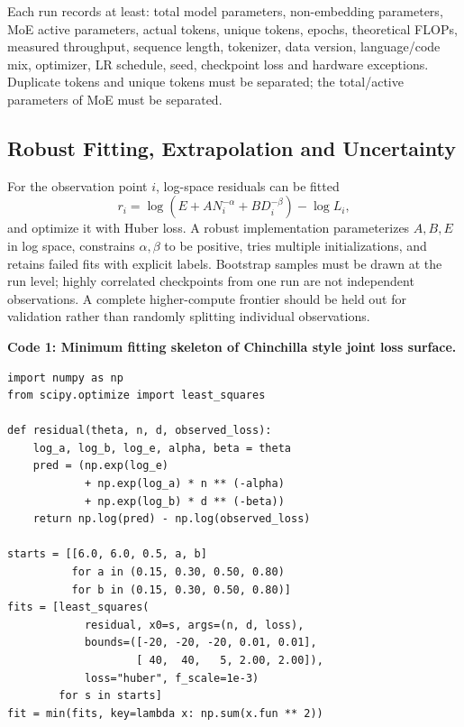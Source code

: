 \documentclass[UTF8,10pt,a4paper,fontset=none]{ctexart}
\begin{document}
Each run records at least: total model parameters, non-embedding parameters, MoE active parameters, actual tokens, unique tokens, epochs, theoretical FLOPs, measured throughput, sequence length, tokenizer, data version, language/code mix, optimizer, LR schedule, seed, checkpoint loss and hardware exceptions. Duplicate tokens and unique tokens must be separated; the total/active parameters of MoE must be separated.

\subsection{Robust Fitting, Extrapolation and Uncertainty}

For the observation point $i$, log-space residuals can be fitted
\begin{equation}
 r_i=\log\!\left(E+A N_i^{-\alpha}+B D_i^{-\beta}\right)-\log L_i,
 \label{eq:residual}
\end{equation}
and optimize it with Huber loss. A robust implementation parameterizes $A,B,E$ in log space, constrains $\alpha,\beta$ to be positive, tries multiple initializations, and retains failed fits with explicit labels. Bootstrap samples must be drawn at the run level; highly correlated checkpoints from one run are not independent observations. A complete higher-compute frontier should be held out for validation rather than randomly splitting individual observations.

\noindent\textbf{ Code 1: Minimum fitting skeleton of Chinchilla style joint loss surface. }\par\vspace{5pt}
\begin{small}
\setlength{\fboxsep}{7pt}
\setlength{\fboxrule}{0.4pt}
\begin{lrbox}{\fitcodebox}
\begin{minipage}{\dimexpr\textwidth-2\fboxsep-2\fboxrule\relax}
\vspace{1pt}
\begin{verbatim}
import numpy as np
from scipy.optimize import least_squares

def residual(theta, n, d, observed_loss):
    log_a, log_b, log_e, alpha, beta = theta
    pred = (np.exp(log_e)
            + np.exp(log_a) * n ** (-alpha)
            + np.exp(log_b) * d ** (-beta))
    return np.log(pred) - np.log(observed_loss)

starts = [[6.0, 6.0, 0.5, a, b]
          for a in (0.15, 0.30, 0.50, 0.80)
          for b in (0.15, 0.30, 0.50, 0.80)]
fits = [least_squares(
            residual, x0=s, args=(n, d, loss),
            bounds=([-20, -20, -20, 0.01, 0.01],
                    [ 40,  40,   5, 2.00, 2.00]),
            loss="huber", f_scale=1e-3)
        for s in starts]
fit = min(fits, key=lambda x: np.sum(x.fun ** 2))
\end{verbatim}
\vspace{-5pt}
\end{minipage}
\end{lrbox}
\noindent{}\par
\end{small}
\end{document}
